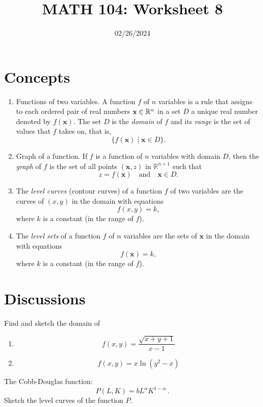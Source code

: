 \documentclass[12pt]{amsart}
\title{ MATH 104: Worksheet 8}
\author{}
\date{02/26/2024}
\begin{document}
\maketitle

\section{Concepts}

\begin{enumerate}
	\item Functions of two variables.
	      A function $f$ of $n$ variables is a rule that assigns to each ordered pair of real numbers $\mathbf{x} \in \mathbb{R}^n$ in a set $D$ a unique real number denoted by $f(\mathbf{x})$.
	      The set $D$ is the \textit{domain} of $f$ and its \textit{range} is the set of values that $f$ takes on, that is,
	      \[
		      \{ f(\mathbf{x}) \mid \mathbf{x} \in D \}.
	      \]

	\item Graph of a function.
	      If $f$ is a function of $n$ variables with domain $D$, then the \textit{graph} of $f$ is the set of all points $(\mathbf{x}, z)$ in $\mathbb{R}^{n+1}$ such that
	      \[
		      z = f(\mathbf{x}) \quad \text{and} \quad \mathbf{x} \in D.
	      \]

	\item The \textit{level curves} (contour curves) of a function $f$ of two variables are the curves of $(x,y) $ in the domain with equations
	      \[
		      f(x, y) = k,
	      \]
	      where $k$ is a constant (in the range of $f$).

	\item The \textit{level sets}  of a function $f$ of $n$ variables are the sets of $\mathbf{x}$ in the domain with equations
	      \[
		      f(\mathbf{x}) = k,
	      \]
	      where $k$ is a constant (in the range of $f$).

\end{enumerate}

\newpage
\section{Discussions}

\begin{question}
	Find and sketch the domain of
	\begin{enumerate}
		\item $$ f(x,y) = \frac{\sqrt{x+y+1}}{x-1}  $$
		      \vspace{7cm}
		\item $$ f(x,y) = x \ln (y^2 - x) $$
		      \vspace{7cm}
	\end{enumerate}
\end{question}



\newpage
\begin{question}
	The Cobb-Douglas function:
	\begin{equation*}
		P(L, K) = b L^\alpha K^{1-\alpha} \,.
	\end{equation*}
	Sketch the level curves of the function $P$.
\end{question}
\end{document}
